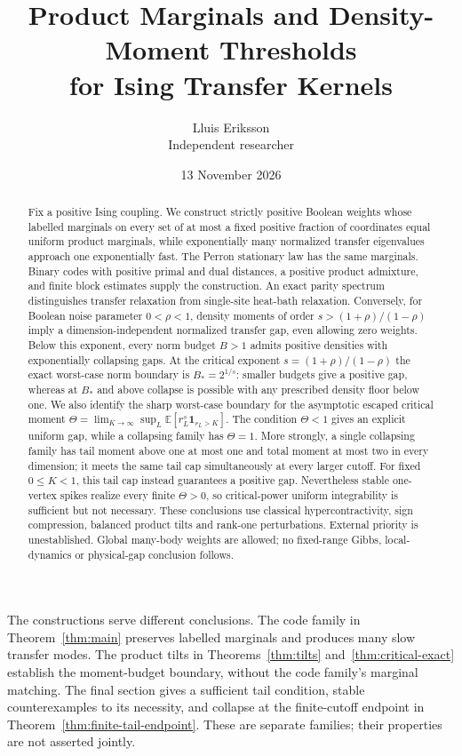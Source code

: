 \documentclass[11pt]{article}
\title{Product Marginals and Density-Moment Thresholds\\for Ising Transfer Kernels}
\author{Lluis Eriksson\\\small Independent researcher}
\date{13 November 2026}
\begin{document}
\maketitle
\begin{abstract}
Fix a positive Ising coupling. We construct strictly positive Boolean
weights whose labelled marginals on every set of at most a fixed positive
fraction of coordinates equal uniform product marginals, while exponentially
many normalized transfer eigenvalues approach one exponentially fast.
The Perron stationary law has the same marginals. Binary codes with positive
primal and dual distances, a positive product admixture, and finite block
estimates supply the construction. An exact parity spectrum distinguishes
transfer relaxation from single-site heat-bath relaxation.
Conversely, for Boolean noise parameter $0<\rho<1$, density moments of order
$s>(1+\rho)/(1-\rho)$ imply a dimension-independent normalized transfer gap,
even allowing zero weights. Below this exponent, every norm budget $B>1$
admits positive densities with exponentially collapsing gaps.
At the critical exponent $s=(1+\rho)/(1-\rho)$ the exact worst-case norm
boundary is $B_*=2^{1/s}$: smaller budgets give a positive gap, whereas
at $B_*$ and above collapse is possible with any prescribed density floor
below one. We also identify the sharp worst-case boundary for the
asymptotic escaped critical moment
$\Theta=\lim_{K\to\infty}\sup_L\mathbb E[r_L^s\mathbf1_{r_L>K}]$.
The condition $\Theta<1$ gives an explicit uniform gap, while a collapsing
family has $\Theta=1$. More strongly, a single collapsing family has tail moment above one
at most one and total moment at most two in every dimension; it meets
the same tail cap simultaneously at every larger cutoff. For fixed
$0\le K<1$, this tail cap instead guarantees a positive gap. Nevertheless stable one-vertex spikes realize every
finite $\Theta>0$, so critical-power uniform integrability is sufficient
but not necessary. These conclusions use classical hypercontractivity,
sign compression, balanced product tilts and rank-one perturbations.
External priority is unestablished. Global many-body weights are allowed;
no fixed-range Gibbs, local-dynamics or physical-gap conclusion follows.
\end{abstract}


The constructions serve different conclusions. The code family in
Theorem~\ref{thm:main} preserves labelled marginals and produces many slow
transfer modes. The product tilts in Theorems~\ref{thm:tilts}
and~\ref{thm:critical-exact} establish the moment-budget boundary, without
the code family's marginal matching. The final section gives a sufficient
tail condition, stable counterexamples to its necessity, and collapse at
the finite-cutoff endpoint in Theorem~\ref{thm:finite-tail-endpoint}.
These are separate families; their properties are not asserted jointly.
\end{document}
